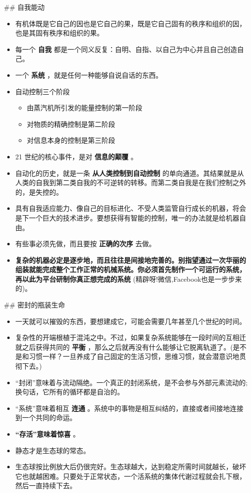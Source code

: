 \documentclass[11pt]{article}
\author{Chen Yangguang}
\date{\today}
\title{}
\begin{document}
\tableofcontents

\#\# 自我能动
\begin{itemize}
\item 有机体既是它自己的因也是它自己的果，既是它自己固有的秩序和组织的因，也是其固有秩序和组织的果。
\item 每一个 \textbf{自我} 都是一个同义反复：自明、自指、以自己为中心并且自己创造自己。
\item 一个 \textbf{系统} ，就是任何一种能够自说自话的东西。
\item 自动控制三个阶段
\begin{itemize}
\item 由蒸汽机所引发的能量控制的第一阶段
\item 对物质的精确控制是第二阶段
\item 对信息本身的控制是第三阶段
\end{itemize}
\item 21 世纪的核心事件，是对 \textbf{信息的颠覆} 。
\item 自动化的历史，就是一条 \textbf{从人类控制到自动控制} 的单向通道。其结果就是从人类的自我到第二类自我的不可逆转的转移。而第二类自我是在我们控制之外的，是失控的。
\item 具有自我适应能力、像自己的目标进化、不受人类监管自行成长的机器，将会是下一个巨大的技术进步。要想获得有智能的控制，唯一的办法就是给机器自由。
\item 有些事必须先做，而且要按 \textbf{正确的次序} 去做。
\item \textbf{复杂的机器必定是逐步地，而且往往是间接地完善的。别指望通过一次华丽的组装就能完成整个工作正常的机械系统。你必须首先制作一个可运行的系统，再以此为平台研制你真正想完成的系统} (精辟呀!微信,Facebook也是一步步来的)。
\end{itemize}

\#\# 密封的瓶装生命

\begin{itemize}
\item 一天就可以摧毁的东西，要想建成它，可能会需要几年甚至几个世纪的时间。
\item 复杂性的开端根植于混沌之中。不过，如果复杂系统能够在一段时间的互相迁就之后获得共同的 \textbf{平衡} ，那么之后就再没有什么能够让它脱离轨道了。(是不是和习惯一样？一旦养成了自己固定的生活习惯，思维习惯，就会潜意识地贯彻下去。)
\item “封闭”意味着与流动隔绝。一个真正的封闭系统，是不会参与外部元素流动的; 换句话，它所有的循环都是自治的。
\item “系统”意味着相互 \textbf{连通} 。系统中的事物是相互纠结的，直接或者间接地连接到一个共同的命运。
\item \textbf{“存活”意味着惊喜} 。
\item 静态才是生态球的常态。
\item 生态球按比例放大后仍很完好。生态球越大，达到稳定所需时间就越长，破坏它也就越困难。只要处于正常状态，一个活系统的集体代谢过程就会扎下根，然后一直持续下去。
\end{itemize}
\end{document}

